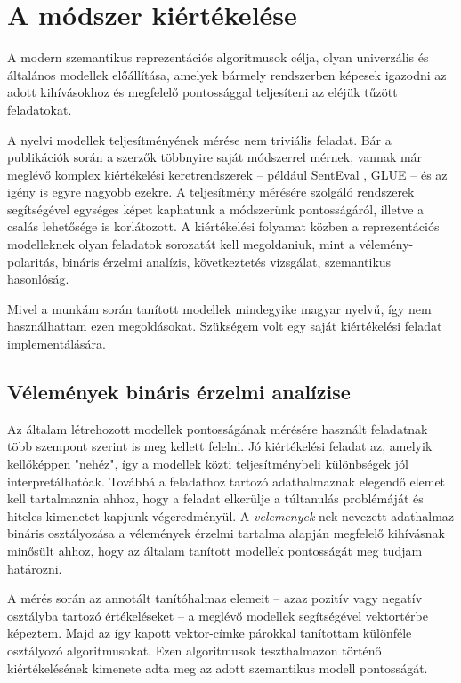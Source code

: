 \chapter{A módszer kiértékelése}
\label{ch:eval}

A modern szemantikus reprezentációs algoritmusok célja, olyan univerzális és általános modellek előállítása, amelyek bármely rendszerben képesek igazodni az adott kihívásokhoz és megfelelő pontossággal teljesíteni az eléjük tűzött feladatokat.

A nyelvi modellek teljesítményének mérése nem triviális feladat. Bár a publikációk során a szerzők többnyire saját módszerrel mérnek, vannak már meglévő komplex kiértékelési keretrendszerek – például SentEval \cite{senteval}, GLUE \cite{glue} – és az igény is egyre nagyobb ezekre. A teljesítmény mérésére szolgáló rendszerek segítségével egységes képet kaphatunk a módszerünk pontosságáról, illetve a csalás lehetősége is korlátozott. A kiértékelési folyamat közben a reprezentációs modelleknek olyan feladatok sorozatát kell megoldaniuk, mint a vélemény-polaritás, bináris érzelmi analízis, következtetés vizsgálat, szemantikus hasonlóság.

Mivel a munkám során tanított modellek mindegyike magyar nyelvű, így nem használhattam ezen megoldásokat. Szükségem volt egy saját kiértékelési feladat implementálására.

\section{Vélemények bináris érzelmi analízise}

Az általam létrehozott modellek pontosságának mérésére használt feladatnak több szempont szerint is meg kellett felelni. Jó kiértékelési feladat az, amelyik kellőképpen "nehéz", így a modellek közti teljesítménybeli különbségek jól interpretálhatóak. Továbbá a feladathoz tartozó adathalmaznak elegendő elemet kell tartalmaznia ahhoz, hogy a feladat elkerülje a túltanulás problémáját és hiteles kimenetet kapjunk végeredményül. A \textit{velemenyek}-nek nevezett adathalmaz bináris osztályozása a vélemények érzelmi tartalma alapján megfelelő kihívásnak minősült ahhoz, hogy az általam tanított modellek pontosságát meg tudjam határozni.

A mérés során az annotált tanítóhalmaz elemeit – azaz pozitív vagy negatív osztályba tartozó értékeléseket – a meglévő modellek segítségével vektortérbe képeztem. Majd az így kapott vektor-címke párokkal tanítottam különféle osztályozó algoritmusokat. Ezen algoritmusok teszthalmazon történő kiértékelésének kimenete adta meg az adott szemantikus modell pontosságát.

